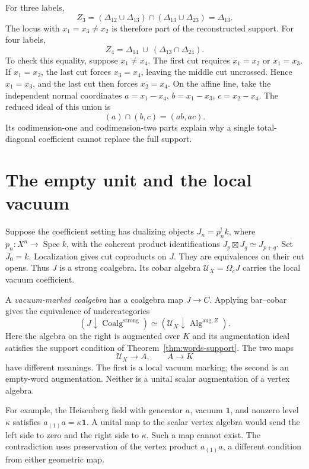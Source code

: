 \begin{example}
\label{ex:words-crossed-support}
For three labels,
\[
 Z_3=(\Delta_{12}\cup\Delta_{13})
       \cap(\Delta_{13}\cup\Delta_{23})=\Delta_{13}.
\]
The locus with \(x_1=x_3\neq x_2\) is therefore part of the
reconstructed support.  For four labels,
\[
 Z_4=\Delta_{14}\ \cup\ (\Delta_{13}\cap\Delta_{24}).
\]
To check this equality, suppose \(x_1\neq x_4\).  The first cut
requires \(x_1=x_2\) or \(x_1=x_3\).  If \(x_1=x_2\), the last cut
forces \(x_3=x_4\), leaving the middle cut uncrossed.
Hence \(x_1=x_3\), and the last cut then forces \(x_2=x_4\).
On the affine line,
take the independent normal coordinates
\(a=x_1-x_4\), \(b=x_1-x_3\), \(c=x_2-x_4\).  The reduced ideal
of this union is
\[
 (a)\cap(b,c)=(ab,ac).
\]
Its codimension-one and codimension-two parts explain why a
single total-diagonal coefficient cannot replace the full support.
\end{example}

\section{The empty unit and the local vacuum}

Suppose the coefficient setting has dualizing objects
\(J_n=p_n^!k\), where \(p_n:X^n\to\operatorname{Spec}k\), with
the coherent product identifications
\(J_p\boxtimes J_q\simeq J_{p+q}\).  Set \(J_0=k\).  Localization
gives cut coproducts on \(J\).  They are equivalences on their cut
opens.  Thus \(J\) is a strong coalgebra.  Its cobar algebra
\(\mathcal U_X=\Omega_cJ\) carries the local vacuum coefficient.

A \emph{vacuum-marked coalgebra} has a coalgebra map \(J\to C\).
Applying bar--cobar gives the equivalence of undercategories
\[
 (J\downarrow\operatorname{Coalg}^{\mathrm{strong}})
 \simeq
 (\mathcal U_X\downarrow
       \operatorname{Alg}^{\mathrm{aug},Z}).
\]
Here the algebra on the right is augmented over \(K\) and its
augmentation ideal satisfies the support condition of
Theorem~\ref{thm:words-support}.  The two maps
\[
 \mathcal U_X\longrightarrow A,\qquad A\longrightarrow K
\]
have different meanings.  The first is a local vacuum marking;
the second is an empty-word augmentation.  Neither is a unital
scalar augmentation of a vertex algebra.

For example, the Heisenberg field with generator \(a\), vacuum
\(\mathbf1\), and nonzero level \(\kappa\) satisfies
\(a_{(1)}a=\kappa\mathbf1\).  A unital map to the scalar vertex
algebra would send the left side to zero and the right side to
\(\kappa\).  Such a map cannot exist.  The contradiction uses
preservation of the vertex product \(a_{(1)}a\), a different
condition from either geometric map.


